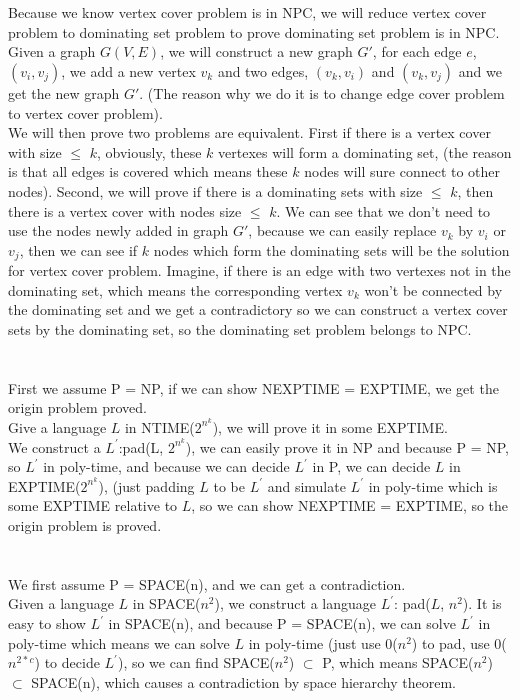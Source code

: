 \documentclass[11pt]{article}
\begin{document}
\part{}
    Because we know vertex cover problem is in NPC, we will reduce vertex cover problem to dominating set problem to prove dominating set problem is in NPC. \\
    Given a graph $G(V,E)$, we will construct a new graph $G'$, for each edge $e$, $(v_{i},v_{j})$, we add a new vertex $v_{k}$ and two edges, $(v_{k},v_{i})$ and $(v_{k},v_{j})$ and we get the new graph $G'$. (The reason why we do it is to change edge cover problem to vertex cover problem). \\
    We will then prove two problems are equivalent. First if there is a vertex cover with size $\leq$ $k$, obviously, these $k$ vertexes will form a dominating set, (the reason is that all edges is covered which means these $k$ nodes will sure connect to other nodes). Second, we will prove if there is a dominating sets with size $\leq$ $k$, then there is a vertex cover with nodes size $\leq$ $k$. We can see that we don't need to use the nodes newly added in graph $G'$, because we can easily replace $v_{k}$ by $v_{i}$ or $v_{j}$, then we can see if $k$ nodes which form the dominating sets will be the solution for vertex cover problem. Imagine, if there is an edge with two vertexes not in the dominating set, which means the corresponding vertex $v_{k}$ won't be connected by the dominating set and we get a contradictory so we can construct a vertex cover sets by the dominating set, so the dominating set problem belongs to NPC.
\part{}
First we assume P = NP, if we can show NEXPTIME = EXPTIME, we get the origin problem proved. \\
Give a language $L$ in NTIME($2^{n^{k}}$), we will prove it in some EXPTIME. \\
We construct a $L^{'}$:pad(L, $2^{n^{k}}$), we can easily prove it in NP and because P = NP, so $L^{'}$ in poly-time, and because we can decide 
$L^{'}$ in P, we can decide $L$ in EXPTIME($2^{n^{k}}$), (just padding $L$ to be $L^{'}$ and simulate $L^{'}$ in poly-time which is some EXPTIME relative to $L$, so we can show NEXPTIME = EXPTIME, so the origin problem is proved.
\part{}
We first assume P = SPACE(n), and we can get a contradiction. \\
Given a language $L$ in SPACE($n^{2}$), we construct a language $L^{'}$: pad($L$, $n^{2}$). It is easy to show $L^{'}$ in SPACE(n), and because P = SPACE(n), we can solve $L^{'}$ in poly-time which means we can solve $L$ in poly-time (just use 0($n^{2}$) to pad, use 0($n^{2*c}$) to decide $L^{'}$), so we can find SPACE($n^{2}$) $\subset$ P, which means SPACE($n^{2}$) $\subset$ SPACE(n), which causes a contradiction by space hierarchy theorem. 
\end{document}
